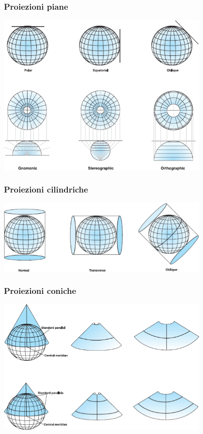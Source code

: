 \documentclass{beamer}
\begin{document}
{\begin{frame}
   \frametitle{Proiezioni piane}
	\begin{center}
		\includegraphics[width=0.8\textwidth] {./pics/piane.png}
	\end{center}
\end{frame}

\begin{frame}
   \frametitle{Proiezioni cilindriche}
	\begin{center}
		\includegraphics[width=0.8\textwidth] {./pics/cilindriche.png}
	\end{center}
\end{frame}

\begin{frame}
   \frametitle{Proiezioni coniche}
	\begin{center}
		\includegraphics[width=0.8\textwidth] {./pics/coniche.png}
	\end{center}
\end{frame}

}
\end{document}
